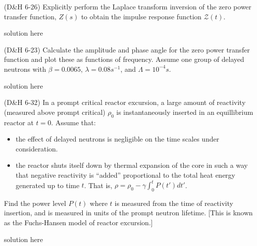 \documentclass[11pt,addpoints]{exam}
\begin{document}
\begin{questions}
        \question[20] (D\&H 6-26) Explicitly perform the Laplace transform 
        inversion of the zero power transfer function, $Z(s)$ to obtain the 
        impulse response function $\mathscr{Z}(t)$.
                \begin{solution}
                        solution here
                \end{solution}
       
        \question[30] (D\&H 6-23) Calculate the amplitude and phase angle for the 
        zero power transfer function and plot these as functions of frequency. 
        Assume one group of delayed neutrons with $\beta = 0.0065$, $\lambda = 
        0.08s^{-1}$, and $\Lambda = 10^{-4}s$.
                \begin{solution}
                        solution here
                \end{solution}
       
        \question[10] (D\&H 6-32) In a prompt critical reactor excursion, a 
        large amount of reactivity (measured above prompt critical) $\rho_0$ is 
        instantaneously inserted in an equillibrium reactor at $t=0$. Assume 
        that:
        \begin{itemize}
                \item the effect of delayed neutrons is negligible on the time 
                        scales under consideration.
                \item the reactor shuts itself down by thermal expansion of the 
                        core in such a way that negative reactivity is 
                        ``added'' proportional to the total heat energy 
                        generated up to time $t$. That is, $\rho = \rho_0 - 
                        \gamma\int_0^t{P(t')dt'}$. 
        \end{itemize}

        Find the power level $P(t)$  where $t$ is measured from the time of 
        reactivity insertion, and is measured in units of the prompt neutron lifetime.
        [This is known as the Fuchs-Hansen model of reactor excursion.]
                \begin{solution}
                        solution here
                \end{solution}

       
\end{questions}



%
%
\end{document}
